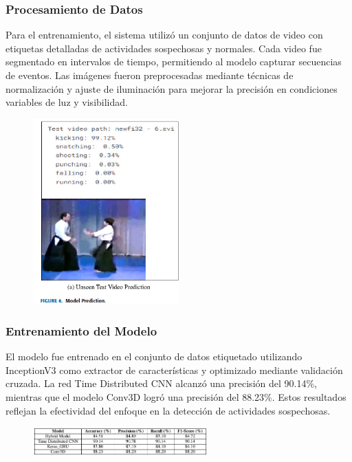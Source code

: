 \documentclass[listof=nochaptergap,12pt,times,authoryear]{report}
\begin{document}
\clearpage


\subsubsection{Procesamiento de Datos}
Para el entrenamiento, el sistema utilizó un conjunto de datos de video con etiquetas detalladas de actividades sospechosas y normales. Cada video fue segmentado en intervalos de tiempo, permitiendo al modelo capturar secuencias de eventos. Las imágenes fueron preprocesadas mediante técnicas de normalización y ajuste de iluminación para mejorar la precisión en condiciones variables de luz y visibilidad.

\begin{figure}[h] %
    \centering
    \includegraphics[width=0.5\textwidth]{pro7.png} %
    \label{fig:ejemplo} %
\end{figure}


\subsubsection{Entrenamiento del Modelo}
El modelo fue entrenado en el conjunto de datos etiquetado utilizando InceptionV3 como extractor de características y optimizado mediante validación cruzada. La red Time Distributed CNN alcanzó una precisión del 90.14\%, mientras que el modelo Conv3D logró una precisión del 88.23\%. Estos resultados reflejan la efectividad del enfoque en la detección de actividades sospechosas.

\begin{figure}[h] %
    \centering
    \includegraphics[width=0.6\textwidth]{ent7.png} %
    \label{fig:ejemplo} %
\end{figure}
\end{document}
